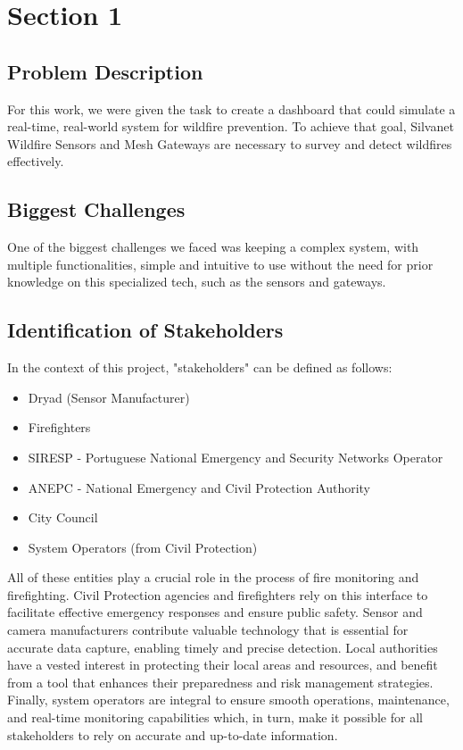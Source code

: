 \chapter{Section 1} \label{section1}
\section{Problem Description}
For this work, we were given the task to create a dashboard 
that could simulate a real-time, real-world system for wildfire 
prevention. To achieve
that goal, Silvanet Wildfire Sensors and Mesh Gateways are necessary to
survey and detect wildfires effectively. 
\section{Biggest Challenges}
One of the biggest challenges we faced was keeping a complex system, with multiple functionalities, simple
and intuitive to use without the need for prior knowledge on this
specialized tech, such as the sensors and gateways. 
\section{Identification of Stakeholders}
In the context of this project, "stakeholders" can be defined as follows:
\begin{itemize}
    \item Dryad (Sensor Manufacturer)
    \item Firefighters
    \item SIRESP - Portuguese National Emergency 
    and Security Networks Operator 
    \item ANEPC - National Emergency and Civil Protection Authority
    \item City Council
    \item System Operators (from Civil Protection)
\end{itemize} \par 
All of these entities play a crucial role in the process of fire monitoring and firefighting. 
Civil Protection agencies and firefighters rely on this 
interface to facilitate effective emergency responses and 
ensure public safety. Sensor and camera manufacturers contribute 
valuable technology that is essential for accurate data capture, 
enabling timely and precise detection. Local authorities have 
a vested interest in protecting their local areas and resources, 
and benefit from a tool that enhances their preparedness and 
risk management strategies. Finally, system operators are integral 
to ensure smooth operations, maintenance, and real-time monitoring 
capabilities which, in turn, make it possible for all stakeholders 
to rely on accurate and up-to-date information. 
